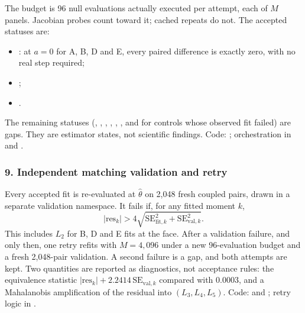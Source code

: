 The budget is 96 null evaluations actually executed per attempt, each of $M$ panels. Jacobian probes count toward it; cached repeats do not. The accepted statuses are:
\begin{itemize}
\item {}: at $a=0$ for A, B, D and E, every paired difference is exactly zero, with no real step required;
\item {};
\item {}.
\end{itemize}
The remaining statuses (, , , , , , and  for controls whose observed fit failed) are gaps. They are estimator states, not scientific findings. Code: ; orchestration in  and .

\subsubsection*{9. Independent matching validation and retry}
Every accepted fit is re-evaluated at $\hat\theta$ on 2,048 fresh coupled pairs, drawn in a separate validation namespace. It fails if, for any fitted moment $k$,
\begin{equation*}
|\mathrm{res}_k|>4\sqrt{\mathrm{SE}_{\mathrm{fit},k}^2+\mathrm{SE}_{\mathrm{val},k}^2}.
\end{equation*}
This includes $L_2$ for B, D and E fits at the face. After a validation failure, and only then, one retry refits with $M=4{,}096$ under a new 96-evaluation budget and a fresh 2,048-pair validation. A second failure is a gap, and both attempts are kept. Two quantities are reported as diagnostics, not acceptance rules: the equivalence statistic $|\mathrm{res}_k|+2.2414\,\mathrm{SE}_{\mathrm{val},k}$ compared with 0.0003, and a Mahalanobis amplification of the residual into $(L_3,L_4,L_5)$. Code:  and ; retry logic in .


